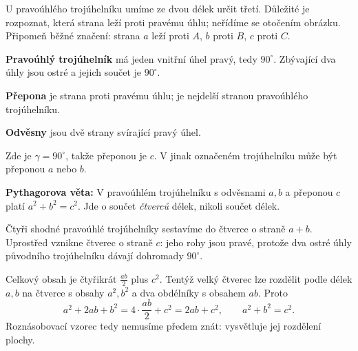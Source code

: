 \documentclass[11pt,a4paper]{article}
\begin{document}
U pravoúhlého trojúhelníku umíme ze dvou délek určit třetí. Důležité je
rozpoznat, která strana leží proti pravému úhlu; neřídíme se otočením obrázku.
Připomeň běžné značení: strana $a$ leží proti $A$, $b$ proti $B$, $c$ proti $C$.

\begin{definiceBox}
\textbf{Pravoúhlý trojúhelník} má jeden vnitřní úhel pravý, tedy $90^\circ$.
Zbývající dva úhly jsou ostré a jejich součet je $90^\circ$.
\end{definiceBox}
\begin{definiceBox}
\textbf{Přepona} je strana proti pravému úhlu; je nejdelší stranou pravoúhlého trojúhelníku.
\end{definiceBox}
\begin{definiceBox}
\textbf{Odvěsny} jsou dvě strany svírající pravý úhel.
\end{definiceBox}
\begin{center}
\end{center}
Zde je $\gamma=90^\circ$, takže přeponou je $c$. V jinak označeném trojúhelníku
může být přeponou $a$ nebo $b$.

\textbf{Pythagorova věta:} V pravoúhlém trojúhelníku s odvěsnami $a,b$ a přeponou $c$
platí $a^2+b^2=c^2$.
Jde o součet \emph{čtverců} délek, nikoli součet délek.

Čtyři shodné pravoúhlé trojúhelníky sestavíme do čtverce o straně $a+b$.
Uprostřed vznikne čtverec o straně $c$: jeho rohy jsou pravé,
protože dva ostré úhly původního trojúhelníku dávají dohromady $90^\circ$.
\begin{center}
\end{center}
Celkový obsah je čtyřikrát $\frac{ab}{2}$ plus $c^2$.
Tentýž velký čtverec lze rozdělit podle délek $a,b$ na čtverce s obsahy
$a^2,b^2$ a dva obdélníky s obsahem $ab$. Proto
\[
a^2+2ab+b^2=4\cdot\frac{ab}{2}+c^2=2ab+c^2,
\qquad a^2+b^2=c^2.
\]
Roznásobovací vzorec tedy nemusíme předem znát: vysvětluje jej rozdělení plochy.
\end{document}
